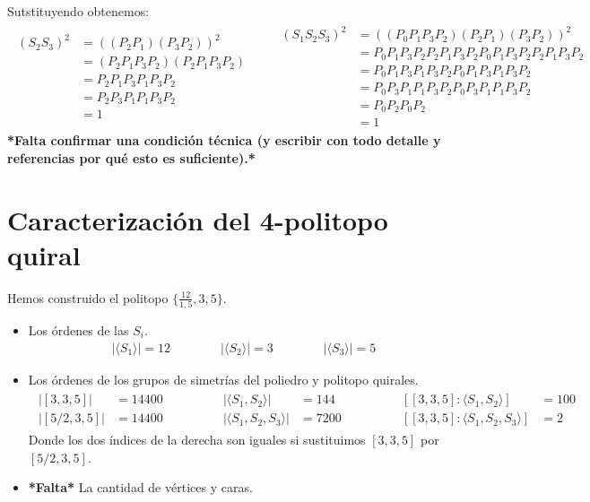 \documentclass[spanish]{article}
\theoremstyle{definition}
\begin{document}
Sutstituyendo obtenemos:
\begin{align*}
	\begin{aligned}
	(S_2S_3)^2&=((P_2P_1)(P_3P_2))^2\\
	&=(P_2P_1P_3P_2)(P_2P_1P_3P_2)\\
	&=P_2P_1P_3P_1P_3P_2\\
	&=P_2P_3P_1P_1P_3P_2\\
	&=1
\end{aligned}
\qquad
\begin{aligned}
	(S_1S_2S_3)^2&=((P_0P_1P_3P_2)(P_2P_1)(P_3P_2))^2\\
	&=P_0P_1P_3P_2P_2P_1P_3P_2P_0P_1P_3P_2P_2P_1P_3P_2\\
	&=P_0P_1P_3P_1P_3P_2P_0P_1P_3P_1P_3P_2\\
	&=P_0P_3P_1P_1P_3P_2P_0P_3P_1P_1P_3P_2\\
	&=P_0P_2P_0P_2\\
	&=1
\end{aligned}
\end{align*}
\textbf{*Falta confirmar una condición técnica (y escribir con todo detalle y referencias por qué esto es suficiente).*}

\section{Caracterización del 4-politopo quiral}
 Hemos construido el politopo $\{\frac{12}{1,5},3,5\}$.
\begin{itemize}
	\item Los órdenes de las $S_i$.
	\begin{align*}
		|\langle S_1\rangle|=12\qquad\qquad|\langle S_2\rangle|=3\qquad\qquad|\langle S_3\rangle|=5
	\end{align*}
	\item Los órdenes de los grupos de simetrías del poliedro y politopo quirales.
	\begin{align*}
		\begin{aligned}
			|[3,3,5]|&=14400\\
			|[5/2,3,5]|&=14400
		\end{aligned}\qquad\qquad
		\begin{aligned}
			|\langle S_1,S_2\rangle|&=144\\
			|\langle S_1,S_2,S_3\rangle|&=7200
		\end{aligned}\qquad\qquad
		\begin{aligned}
			[[3,3,5]:\langle S_1,S_2\rangle]&=100\\
			[[3,3,5]:\langle S_1,S_2,S_3\rangle]&=2
		\end{aligned}
	\end{align*}
	Donde los dos índices de la derecha son iguales si sustituimos $[3,3,5]$ por $[5/2,3,5]$.
	\item \textbf{*Falta*} La cantidad de vértices y caras.
\end{itemize}
\end{document}
